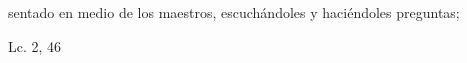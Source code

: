 \documentclass[../../rosario.tex]{subfiles}
\begin{document}
    sentado en medio de los maestros, escuchándoles y haciéndoles preguntas;
    \begin{flushright}
    Lc. 2, 46       
    \end{flushright}
\end{document}
